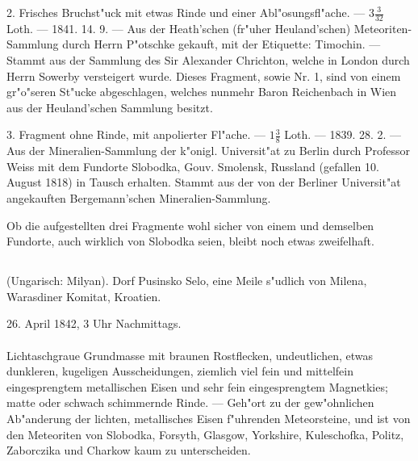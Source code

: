 \documentclass[a4paper, 11pt, oneside, polutonikogreek, german]{article}
\begin{document}
2. Frisches Bruchst"uck mit etwas Rinde und einer Abl"osungsfl"ache. --- $\mathfrak{3\frac{3}{32}}$ Loth. --- 1841. 14. 9. --- Aus der Heath'schen (fr"uher Heuland'schen) Meteoriten-Sammlung durch Herrn P"otschke gekauft, mit der Etiquette: Timochin. --- Stammt aus der Sammlung des Sir Alexander Chrichton, welche in London durch Herrn Sowerby versteigert wurde. Dieses Fragment, sowie Nr. 1, sind von einem gr"o"seren St"ucke abgeschlagen, welches nunmehr Baron Reichenbach in Wien aus der Heuland'schen Sammlung besitzt.

3. Fragment ohne Rinde, mit anpolierter Fl"ache. --- $\mathfrak{1\frac{3}{8}}$ Loth. --- 1839. 28. 2. --- Aus der Mineralien-Sammlung der k"onigl. Universit"at zu Berlin durch Professor Weiss mit dem Fundorte Slobodka‚ Gouv. Smolensk, Russland (gefallen 10. August 1818) in Tausch erhalten. Stammt aus der von der Berliner Universit"at angekauften Bergemann’schen Mineralien-Sammlung.

\setlength{\leftskip}{10mm}
\setlength{\parindent}{0pt}

{\footnotesize Ob die aufgestellten drei Fragmente wohl sicher von einem und demselben Fundorte, auch wirklich von Slobodka seien, bleibt noch etwas zweifelhaft.}

\setlength{\leftskip}{0pt}
\setlength{\parindent}{20pt}

\subsection{}
\begin{center}

(Ungarisch: Milyan). Dorf Pusinsko Selo, eine Meile s"udlich von Milena, Warasdiner Komitat, Kroatien.

26. April 1842, 3 Uhr Nachmittags.
\end{center}
\paragraph{}
Lichtaschgraue Grundmasse mit braunen Rostflecken, undeutlichen, etwas dunkleren, kugeligen Ausscheidungen, ziemlich viel fein und mittelfein eingesprengtem metallischen Eisen und sehr fein eingesprengtem Magnetkies; matte oder schwach schimmernde Rinde. --- Geh"ort zu der gew"ohnlichen Ab"anderung der lichten, metallisches Eisen f"uhrenden Meteorsteine, und ist von den Meteoriten von Slobodka, Forsyth, Glasgow, Yorkshire, Kuleschofka, Politz, Zaborczika und Charkow kaum zu unterscheiden.
\end{document}

